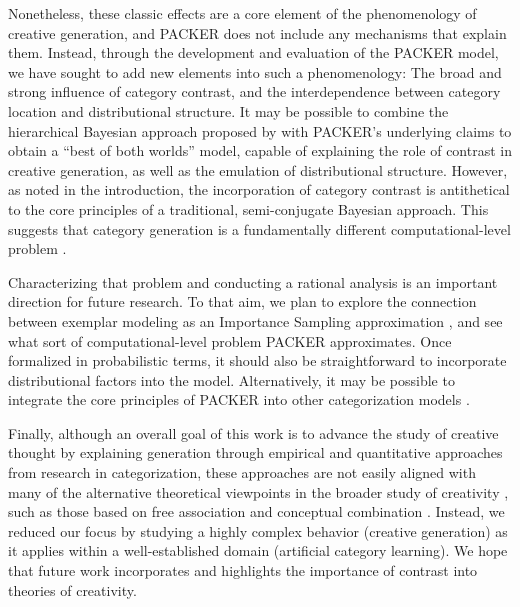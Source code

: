 \documentclass[12pt]{article}
\begin{document}
\begin{flushleft}
Nonetheless, these classic effects are a core element of the phenomenology of creative generation, and PACKER does not include any mechanisms that explain them. Instead, through the development and evaluation of the PACKER model, we have sought to add new elements into such a phenomenology: The broad and strong influence of category contrast, and the interdependence between category location and distributional structure. It may be possible to combine the hierarchical Bayesian approach proposed by \cite{jern2013probabilistic} with PACKER's underlying claims to obtain a ``best of both worlds'' model, capable of explaining the role of contrast in creative generation, as well as the emulation of distributional structure. However, as noted in the introduction, the incorporation of category contrast is antithetical to the core principles of a traditional, semi-conjugate Bayesian approach. This suggests that category generation is a fundamentally different computational-level problem \citep[different from those posed by][]{jern2013probabilistic,kemp2014taxonomy}. 

Characterizing that problem and conducting a rational analysis is an important direction for future research. To that aim, we plan to explore the connection between exemplar modeling as an Importance Sampling approximation \citep{shi10exemplar}, and see what sort of computational-level problem PACKER approximates. Once formalized in probabilistic terms, it should also be straightforward to incorporate distributional factors into the model. Alternatively, it may be possible to integrate the core principles of PACKER into other categorization models \citep[e.g.,][]{love2004sustain,kurtz2007divergent,smith2000thirty}.

Finally, although an overall goal of this work is to advance the study of creative thought by explaining generation through empirical and quantitative approaches from research in categorization, these approaches are not easily aligned with many of the alternative theoretical viewpoints in the broader study of creativity \citep[for a review see][]{kozbelt2010theories}, such as those based on free association \citep{mednick1962associative} and conceptual combination \citep{estes2002emergence,murphy1988comprehending}. Instead, we reduced our focus by studying a highly complex behavior (creative generation) as it applies within a well-established domain (artificial category learning). We hope that future work incorporates and highlights the importance of contrast into theories of creativity.




\end{flushleft}
\end{document}
